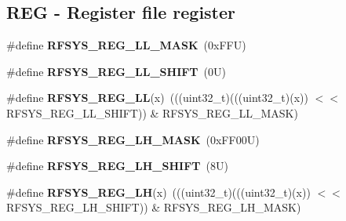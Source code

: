 \subsection*{R\+EG -\/ Register file register}
\begin{DoxyCompactItemize}
\item 
\mbox{\label{group___r_f_s_y_s___register___masks_ga2fe64579aaef18ce266e3d6c316d3241}} 
\#define {\bfseries R\+F\+S\+Y\+S\+\_\+\+R\+E\+G\+\_\+\+L\+L\+\_\+\+M\+A\+SK}~(0x\+F\+F\+U)
\item 
\mbox{\label{group___r_f_s_y_s___register___masks_gaab45c60c0a8e5edb59537ee2bcb2bbcf}} 
\#define {\bfseries R\+F\+S\+Y\+S\+\_\+\+R\+E\+G\+\_\+\+L\+L\+\_\+\+S\+H\+I\+FT}~(0\+U)
\item 
\mbox{\label{group___r_f_s_y_s___register___masks_gaf197b94e2d03011c483dee604724cfda}} 
\#define {\bfseries R\+F\+S\+Y\+S\+\_\+\+R\+E\+G\+\_\+\+LL}(x)~(((uint32\+\_\+t)(((uint32\+\_\+t)(x)) $<$$<$ R\+F\+S\+Y\+S\+\_\+\+R\+E\+G\+\_\+\+L\+L\+\_\+\+S\+H\+I\+FT)) \& R\+F\+S\+Y\+S\+\_\+\+R\+E\+G\+\_\+\+L\+L\+\_\+\+M\+A\+SK)
\item 
\mbox{\label{group___r_f_s_y_s___register___masks_ga9f8ddcb45324c34fd2d19417b8b13d11}} 
\#define {\bfseries R\+F\+S\+Y\+S\+\_\+\+R\+E\+G\+\_\+\+L\+H\+\_\+\+M\+A\+SK}~(0x\+F\+F00\+U)
\item 
\mbox{\label{group___r_f_s_y_s___register___masks_gabe96c857aab7668805c1fb3ea46693bf}} 
\#define {\bfseries R\+F\+S\+Y\+S\+\_\+\+R\+E\+G\+\_\+\+L\+H\+\_\+\+S\+H\+I\+FT}~(8\+U)
\item 
\mbox{\label{group___r_f_s_y_s___register___masks_ga9b8cd1814fd5957849b91bfd1bdf6ac6}} 
\#define {\bfseries R\+F\+S\+Y\+S\+\_\+\+R\+E\+G\+\_\+\+LH}(x)~(((uint32\+\_\+t)(((uint32\+\_\+t)(x)) $<$$<$ R\+F\+S\+Y\+S\+\_\+\+R\+E\+G\+\_\+\+L\+H\+\_\+\+S\+H\+I\+FT)) \& R\+F\+S\+Y\+S\+\_\+\+R\+E\+G\+\_\+\+L\+H\+\_\+\+M\+A\+SK)
\item 
\mbox{\label{group___r_f_s_y_s___register___masks_ga063f595b6c7267627c96048590611cc1}} 

\end{DoxyCompactItemize}
